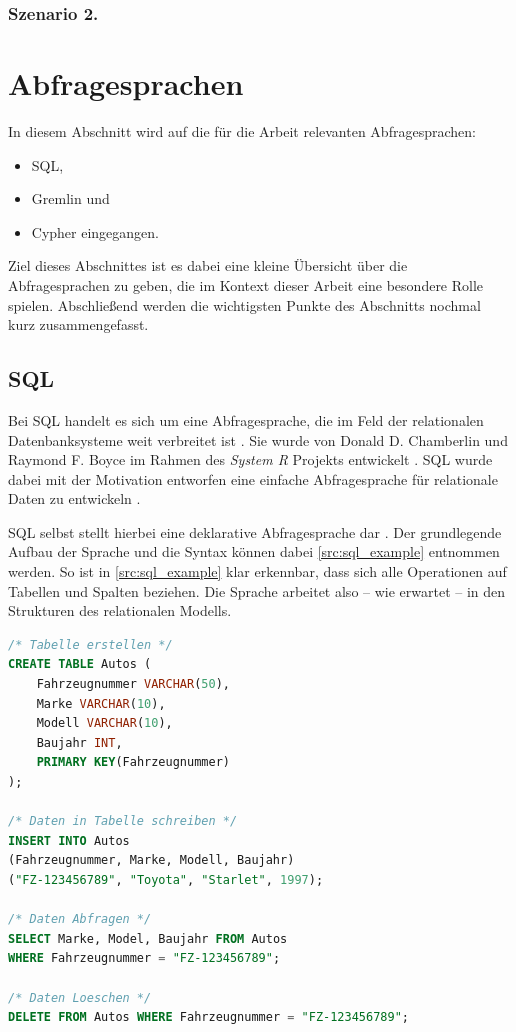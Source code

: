 \subsubsection{Szenario 2.}


\section{Abfragesprachen}
In diesem Abschnitt wird auf die für die Arbeit relevanten Abfragesprachen:
\begin{itemize}
    \item SQL,
    \item Gremlin und
    \item Cypher eingegangen.
\end{itemize}
Ziel dieses Abschnittes ist es dabei eine kleine Übersicht über die Abfragesprachen zu geben, die im Kontext dieser Arbeit eine besondere Rolle spielen. Abschließend werden die wichtigsten Punkte des Abschnitts nochmal kurz zusammengefasst.

\subsection{SQL}
Bei SQL handelt es sich um eine Abfragesprache, die im Feld der relationalen Datenbanksysteme weit verbreitet ist \cite{sql_history}. Sie wurde von Donald D. Chamberlin und Raymond F. Boyce im Rahmen des \textit{System R} Projekts entwickelt \cite{sql_history}. SQL wurde dabei mit der Motivation entworfen eine einfache Abfragesprache für relationale Daten zu entwickeln \cite{sql_history}. 

SQL selbst stellt hierbei eine deklarative Abfragesprache dar \cite{sql_history}. Der grundlegende Aufbau der Sprache und die Syntax können dabei \autoref{src:sql_example} entnommen werden. So ist in \autoref{src:sql_example} klar erkennbar, dass sich alle Operationen auf Tabellen und Spalten beziehen. Die Sprache arbeitet also -- wie erwartet -- in den Strukturen des relationalen Modells.

\begin{lstlisting}[caption={Beispiel SQL-Queries},language=SQL,label=src:sql_example]
/* Tabelle erstellen */
CREATE TABLE Autos (
    Fahrzeugnummer VARCHAR(50), 
    Marke VARCHAR(10), 
    Modell VARCHAR(10), 
    Baujahr INT,
    PRIMARY KEY(Fahrzeugnummer)
);

/* Daten in Tabelle schreiben */
INSERT INTO Autos 
(Fahrzeugnummer, Marke, Modell, Baujahr) 
("FZ-123456789", "Toyota", "Starlet", 1997);

/* Daten Abfragen */
SELECT Marke, Model, Baujahr FROM Autos 
WHERE Fahrzeugnummer = "FZ-123456789";

/* Daten Loeschen */
DELETE FROM Autos WHERE Fahrzeugnummer = "FZ-123456789";
\end{lstlisting}


